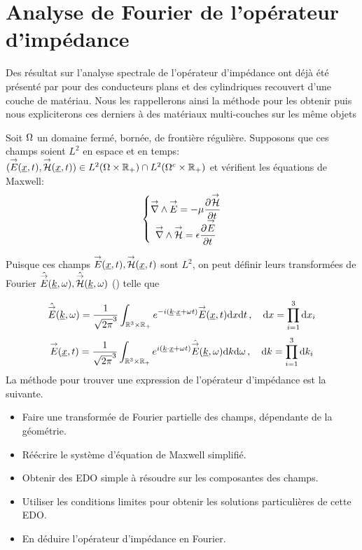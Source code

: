 \section{Analyse de Fourier de l'opérateur d'impédance}

Des résultat sur l'analyse spectrale de l'opérateur d'impédance ont déjà été présenté par \cite{hoppe_impedance_1995} pour des conducteurs plans et des cylindriques recouvert d'une couche de matériau.
Nous les rappellerons ainsi la méthode pour les obtenir puis nous expliciterons ces derniers à des matériaux multi-couches sur les même objets


Soit \(\Omega\) un domaine fermé, bornée, de frontière régulière. Supposons que ces champs soient \(L^2\) en espace et en temps: \(({\overset{\rightarrow}{E}}(\underline{x},t),{\overset{\rightarrow}{\mathcal{H}}}(\underline{x},t)) \in L^2(\Omega \times \mathbb R_+) \cap L^2(\Omega^c\times\mathbb R_+)\) et vérifient les équations de Maxwell:
\begin{equation}
    \left\lbrace 
    \begin{matrix}
    {\overset{\rightarrow}{\nabla}}\wedge {\overset{\rightarrow}{E}} = -\mu \dfrac{\partial^{{}} {\overset{\rightarrow}{\mathcal{H}}}}{{\partial t}^{{}}} \\
    {\overset{\rightarrow}{\nabla}}\wedge {\overset{\rightarrow}{\mathcal{H}}} = \epsilon \dfrac{\partial^{{}} {\overset{\rightarrow}{E}}}{{\partial t}^{{}}}
    \end{matrix}
    \right.
\end{equation}

Puisque ces champs \({\overset{\rightarrow}{E}}(\underline{x},t),{\overset{\rightarrow}{\mathcal{H}}}(\underline{x},t)\) sont \(L^2\), on peut définir leurs transformées de Fourier \(\hat{{\overset{\rightarrow}{E}}}(\underline{k},\omega), \hat{{\overset{\rightarrow}{\mathcal{H}}}}(\underline{k},\omega)\) (\cite[Théorème de Plancherel, p.~153]{yosida_functional_1995}) telle que

\begin{equation}
    \hat{{\overset{\rightarrow}{E}}} (\underline{k},\omega) = \dfrac{1}{\sqrt{2\pi}^3}\int_{\mathbb R^3\times\mathbb R_+} e^{-i(\underline{k} \cdot \underline{x}+\omega t)}{\overset{\rightarrow}{E}}(\underline{x},t) \mathrm{d}{x}\mathrm{d}{t}\,, \quad \mathrm{d} x = \prod\limits_{i=1}^3 \mathrm{d}{x}_i
\end{equation}
\begin{equation}
    {\overset{\rightarrow}{E}}(\underline{x},t) = \dfrac{1}{\sqrt{2\pi}^3}\int_{\mathbb R^3\times\mathbb R_+} e^{i(\underline{k} \cdot \underline{x}+\omega t)}\hat{{\overset{\rightarrow}{E}}} (\underline{k},\omega) \mathrm{d}{k} \mathrm{d}{\omega}\,, \quad \mathrm{d} k = \prod\limits_{i=1}^3 \mathrm{d}{k}_i
\end{equation}
La méthode pour trouver une expression de l'opérateur d'impédance est la suivante.
\begin{itemize}
\item Faire une transformée de Fourier partielle des champs, dépendante de la géométrie.
\item Réécrire le système d'équation de Maxwell simplifié.
\item Obtenir des EDO simple à résoudre sur les composantes des champs.
\item Utiliser les conditions limites pour obtenir les solutions particulières de cette EDO. 
\item En déduire l'opérateur d'impédance en Fourier.
\end{itemize}

